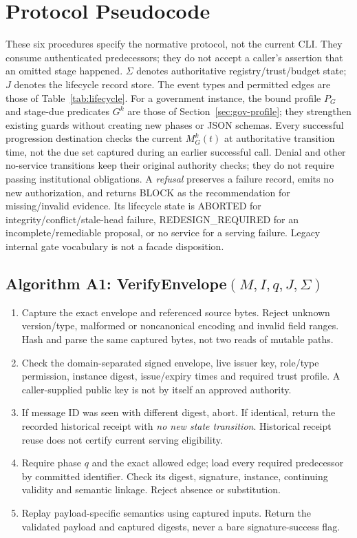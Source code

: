\section{Protocol Pseudocode}
\label{app:algorithms}
These six procedures specify the normative protocol, not the current CLI.
They consume authenticated predecessors; they do not accept a caller's
assertion that an omitted stage happened. $\Sigma$ denotes authoritative
registry/trust/budget state; $J$ denotes the lifecycle record store.
The event types and permitted edges are those of Table~\ref{tab:lifecycle}.
For a government instance, the bound profile $P_G$ and stage-due predicates
$G^k$ are those of Section~\ref{sec:gov-profile}; they strengthen existing
guards without creating new phases or JSON schemas.
Every successful progression destination checks the current $M_G^k(t)$ at authoritative
transition time, not the due set captured during an earlier successful call.
Denial and other no-service transitions keep their original authority checks;
they do not require passing institutional obligations.
A \emph{refusal} preserves a failure record, emits no new authorization, and
returns BLOCK as the recommendation for missing/invalid evidence.
Its lifecycle state is ABORTED for integrity/conflict/stale-head failure,
REDESIGN\_REQUIRED for an incomplete/remediable proposal, or no service for a
serving failure. Legacy internal gate vocabulary is not a facade disposition.

\subsection{Algorithm A1: VerifyEnvelope$(M,I,q,J,\Sigma)$}
\begin{enumerate}
\item Capture the exact envelope and referenced source bytes. Reject unknown
version/type, malformed or noncanonical encoding and invalid field ranges.
Hash and parse the same captured bytes, not two reads of mutable paths.
\item Check the domain-separated signed envelope, live issuer key, role/type
permission, instance digest, issue/expiry times and required trust profile.
A caller-supplied public key is not by itself an approved authority.
\item If message ID was seen with different digest, abort. If identical,
return the recorded historical receipt with \emph{no new state transition}.
Historical receipt reuse does not certify current serving eligibility.
\item Require phase $q$ and the exact allowed edge; load every required
predecessor by committed identifier. Check its digest, signature, instance,
continuing validity and semantic linkage. Reject absence or substitution.
\item Replay payload-specific semantics using captured inputs. Return the
validated payload and captured digests, never a bare signature-success flag.
\end{enumerate}

